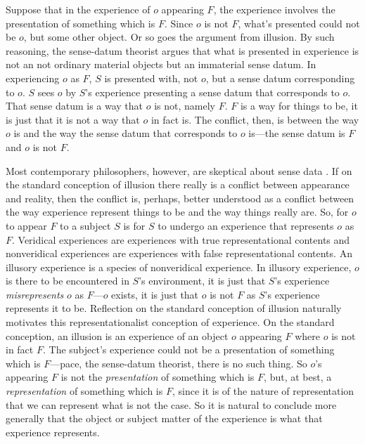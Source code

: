 \documentclass[12pt]{article}
\begin{document}
Suppose that in the experience of \( o \) appearing \( F \), the experience involves the presentation of something which is \( F \). Since \( o \) is not \( F \), what's presented could not be \( o \), but some other object. Or so goes the argument from illusion. By such reasoning, the sense-datum theorist argues that what is presented in experience is not an not ordinary material objects but an immaterial sense datum.  In experiencing \( o \) as \( F \), \( S \) is presented with, not \( o \), but a sense datum corresponding to \( o \). \( S \) sees \( o \) by \( S \)'s experience presenting a sense datum that corresponds to \( o \).  That sense datum is a way that \( o \) is not, namely \( F \). \( F \) is a way for things to be, it is just that it is not a way that \( o \) in fact is. The conflict, then, is between the way \( o \) is and the way the sense datum that corresponds to \( o \) is---the sense datum is \( F \) and \( o \) is not \( F \). 

Most contemporary philosophers, however, are skeptical about sense data \citep[though see][]{robinson94}. If on the standard conception of illusion there really is a conflict between appearance and reality, then the conflict is, perhaps, better understood as a conflict between the way experience represent things to be and the way things really are. So, for \( o \) to appear \( F \) to a subject \( S \) is for \( S \) to undergo an experience that represents \( o \) as \( F \). Veridical experiences are experiences with true representational contents and nonveridical experiences are experiences with false representational contents. An illusory experience is a species of nonveridical experience. In illusory experience, \( o \) is there to be encountered in \( S \)'s environment, it is just that \( S \)'s experience \emph{misrepresents} \( o \) as \( F \)---\( o \) exists, it is just that \( o \) is not \( F \) as \( S \)'s experience represents it to be. Reflection on the standard conception of illusion naturally motivates this representationalist conception of experience. On the standard conception, an illusion is an experience of an object \( o \) appearing \( F \) where \( o \) is not in fact \( F \). The subject's experience could not be a presentation of something which is \( F \)---pace, the sense-datum theorist, there is no such thing. So \( o \)'s appearing \( F \) is not the \emph{presentation} of something which is \( F \), but, at best, a \emph{representation} of something which is \( F \), since it is of the nature of representation that we can represent what is not the case. So it is natural to conclude more generally that the object or subject matter of the experience is what that experience represents.
\end{document}
